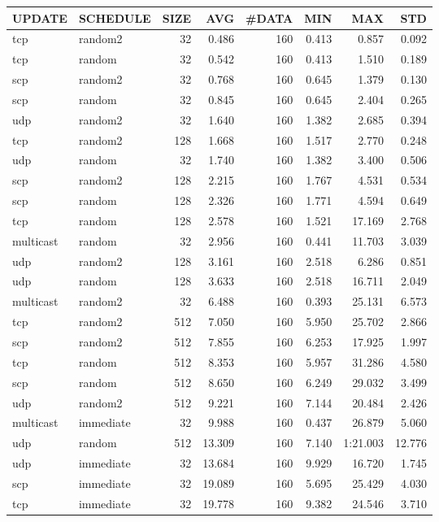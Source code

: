 \begin{tabular}{|l|l|r|r|r|r|r|r|}
\hline
UPDATE & SCHEDULE & SIZE & AVG & \#DATA & MIN & MAX & STD\\
\hline
tcp & random2 & 32 &  0.486 & 160 & 0.413 & 0.857 & 0.092\\
tcp & random & 32 &  0.542 & 160 & 0.413 & 1.510 & 0.189\\
scp & random2 & 32 &  0.768 & 160 & 0.645 & 1.379 & 0.130\\
scp & random & 32 &  0.845 & 160 & 0.645 & 2.404 & 0.265\\
udp & random2 & 32 &  1.640 & 160 & 1.382 & 2.685 & 0.394\\
tcp & random2 & 128 &  1.668 & 160 & 1.517 & 2.770 & 0.248\\
udp & random & 32 &  1.740 & 160 & 1.382 & 3.400 & 0.506\\
scp & random2 & 128 &  2.215 & 160 & 1.767 & 4.531 & 0.534\\
scp & random & 128 &  2.326 & 160 & 1.771 & 4.594 & 0.649\\
tcp & random & 128 &  2.578 & 160 & 1.521 & 17.169 & 2.768\\
multicast & random & 32 &  2.956 & 160 & 0.441 & 11.703 & 3.039\\
udp & random2 & 128 &  3.161 & 160 & 2.518 & 6.286 & 0.851\\
udp & random & 128 &  3.633 & 160 & 2.518 & 16.711 & 2.049\\
multicast & random2 & 32 &  6.488 & 160 & 0.393 & 25.131 & 6.573\\
tcp & random2 & 512 &  7.050 & 160 & 5.950 & 25.702 & 2.866\\
scp & random2 & 512 &  7.855 & 160 & 6.253 & 17.925 & 1.997\\
tcp & random & 512 &  8.353 & 160 & 5.957 & 31.286 & 4.580\\
scp & random & 512 &  8.650 & 160 & 6.249 & 29.032 & 3.499\\
udp & random2 & 512 &  9.221 & 160 & 7.144 & 20.484 & 2.426\\
multicast & immediate & 32 &  9.988 & 160 & 0.437 & 26.879 & 5.060\\
udp & random & 512 &  13.309 & 160 & 7.140 & 1:21.003 & 12.776\\
udp & immediate & 32 &  13.684 & 160 & 9.929 & 16.720 & 1.745\\
scp & immediate & 32 &  19.089 & 160 & 5.695 & 25.429 & 4.030\\
tcp & immediate & 32 &  19.778 & 160 & 9.382 & 24.546 & 3.710\\

\end{tabular}
